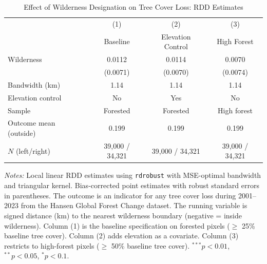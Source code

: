 \begin{table}[t]
\centering
\caption{Effect of Wilderness Designation on Tree Cover Loss: RDD Estimates}
\label{tab:main_rdd}
\begin{tabular}{lccc}
\hline\hline
 & (1) & (2) & (3) \\
 & Baseline & Elevation Control & High Forest \\
\hline
Wilderness & 0.0112 & 0.0114 & 0.0070 \\
 & (0.0071) & (0.0070) & (0.0074) \\
\hline
Bandwidth (km) & 1.14 & 1.14 & 1.14 \\
Elevation control & No & Yes & No \\
Sample & Forested & Forested & High forest \\
Outcome mean (outside) & 0.199 & 0.199 & 0.199 \\
$N$ (left/right) & 39,000 / 34,321 & 39,000 / 34,321 & 39,000 / 34,321 \\
\hline\hline
\end{tabular}
\begin{tablenotes}[flushleft]
\small
\item \textit{Notes:} Local linear RDD estimates using \texttt{rdrobust} with MSE-optimal bandwidth and triangular kernel. Bias-corrected point estimates with robust standard errors in parentheses. The outcome is an indicator for any tree cover loss during 2001--2023 from the Hansen Global Forest Change dataset. The running variable is signed distance (km) to the nearest wilderness boundary (negative = inside wilderness). Column (1) is the baseline specification on forested pixels ($\geq$ 25\% baseline tree cover). Column (2) adds elevation as a covariate. Column (3) restricts to high-forest pixels ($\geq$ 50\% baseline tree cover). $^{***}p<0.01$, $^{**}p<0.05$, $^{*}p<0.1$.
\end{tablenotes}
\end{table}
